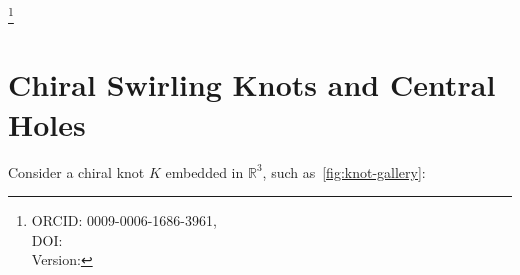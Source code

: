 \documentclass[reprint,aps,onecolumn,nofootinbib]{revtex4-2}
\newcommand{\swirlarrow}{%
    \mathchoice{\mkern-2mu\scriptstyle\boldsymbol{\circlearrowleft}}%
    {\mkern-2mu\scriptstyle\boldsymbol{\circlearrowleft}}%
    {\mkern-2mu\scriptscriptstyle\boldsymbol{\circlearrowleft}}%
    {\mkern-2mu\scriptscriptstyle\boldsymbol{\circlearrowleft}}%
}
\newcommand{\SwirlClock}{S_{(t)}^{\swirlarrow}}
\begin{document}
	\title{\papertitle }
	\author{Omar Iskandarani}
    \thanks{ORCID: 0009-0006-1686-3961,\\
            DOI: \paperdoi \\
            Version: \paperversion
    }
	\date{\today}

\begin{abstract}
We derive long-range gravitational attraction in Swirl--String Theory (SST) as a direct consequence of \emph{chiral swirling knots}---topological vortex filaments such as the trefoil (\(3_1\)), cinquefoil (\(5_1\), (\(5_2\)), and stevedore (\(6_1\)).
Each knot encloses a central rotational line, which acts as an anchor of circulation.
Using Cauchy's integral theorem, we show that the circulation measured around any loop enclosing this axis is quantized by the knot's winding number.
This quantization is expressed by the Swirl Clock \(\SwirlClock\), and its persistence explains why neutral molecules (e.g.\ H\(_2\) attract in otherwise flat space: their knots are connected via the same central swirl line extending beyond the equal-pressure boundary.
\end{abstract}
\maketitle





\section{Chiral Swirling Knots and Central Holes}
    Consider a chiral knot $K$ embedded in $\mathbb{R}^3$, such as~\ref{fig:knot-gallery}:
\end{document}
